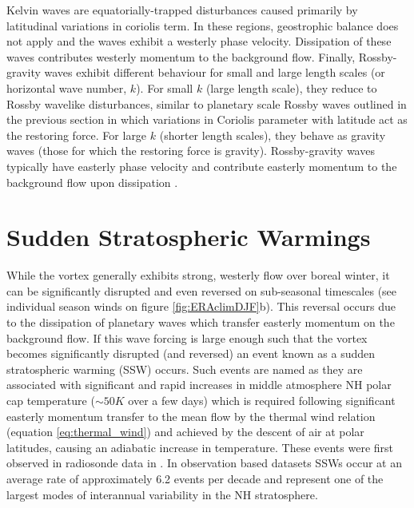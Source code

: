 Kelvin waves are equatorially-trapped disturbances caused primarily by latitudinal variations in coriolis term. In these regions, geostrophic balance does not apply and the waves exhibit a westerly phase velocity. Dissipation of these waves contributes westerly momentum to the background flow. Finally, Rossby-gravity waves exhibit different behaviour for small and large length scales (or horizontal wave number, $k$). For small $k$ (large length scale), they reduce to Rossby wavelike disturbances, similar to planetary scale Rossby waves outlined in the previous section in which variations in Coriolis parameter with latitude act as the restoring force. For large $k$ (shorter length scales), they behave as gravity waves (those for which the restoring force is gravity). Rossby-gravity waves typically have easterly phase velocity and contribute easterly momentum to the background flow upon dissipation \citep{andrewsPlanetary1976}.

\section{Sudden Stratospheric Warmings}
\label{sec:SSWs}
While the vortex generally exhibits strong, westerly flow over boreal winter, it can be significantly disrupted and even reversed on sub-seasonal timescales
(see individual season winds on figure \ref{fig:ERAclimDJF}b). This reversal occurs due to the dissipation of planetary waves which transfer easterly momentum on the background flow. If this wave forcing is large enough such that the vortex becomes significantly disrupted (and reversed) an event known as a sudden stratospheric warming (SSW) occurs. Such events are named as they are associated with significant and rapid increases in middle atmosphere NH polar cap temperature ($\sim50K$ over a few days) which is required following significant easterly momentum transfer to the mean flow by the thermal wind relation (equation \ref{eq:thermal_wind}) and achieved by the descent of air at polar latitudes, causing an adiabatic increase in temperature. These events were first observed in radiosonde data in \cite{scherhagExplosionsartigen1952}. In observation based datasets SSWs occur at an average rate of approximately 6.2 events per decade \citep{butlerSudden2017} and represent one of the largest modes of interannual variability in the NH stratosphere.

